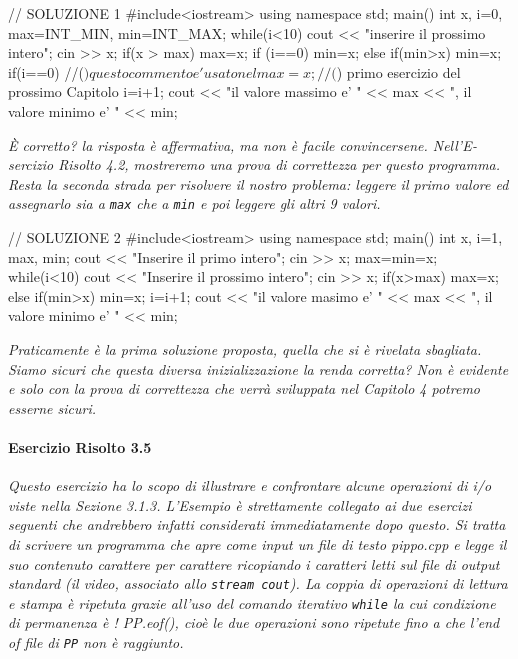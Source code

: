 \documentclass[a4paper,12pt]{book}
\begin{document}
\begin{codice}

// SOLUZIONE 1
#include<iostream>
using namespace std;
main() {
  int x, i=0, max=INT_MIN, min=INT_MAX;
  while(i<10) {
    cout << "inserire il prossimo intero";
    cin >> x; 
    if(x > max) {
      max=x;
      if (i==0)
        min=x;
    }
    else
      if(min>x) {
        min=x;
        if(i==0) //($) questo commento e' usato nel
        max=x;   //($) primo esercizio del prossimo Capitolo
      }
    i=i+1;
  }
  cout << "il valore massimo e' " << max << ", il valore minimo e' " << min;
}
\end{codice}

\textit{È corretto? la risposta è affermativa, ma non è facile convincersene.
Nell'E­sercizio Risolto 4.2, mostreremo una prova di correttezza per questo programma.
Resta la seconda strada per risolvere il nostro problema: leggere il primo valore ed assegnarlo sia a \texttt{max} che a \texttt{min} e poi leggere gli altri 9 valori.}

\begin{codice}

// SOLUZIONE 2
#include<iostream>
using namespace std;
main() {
  int x, i=1, max, min;
  cout << "Inserire il primo intero";
  cin >> x;
  max=min=x;
  while(i<10) {
    cout << "Inserire il prossimo intero";
    cin >> x;
    if(x>max)
      max=x;
    else
      if(min>x)
        min=x;
    i=i+1;
  }
  cout << "il valore masimo e' " << max << ", il valore minimo e' " << min;
}
\end{codice}

\noindent \textit{Praticamente è la prima soluzione proposta, quella che si è rivelata sbagliata.
Siamo sicuri che questa diversa inizializzazione la renda corretta?
Non è evidente e solo con la prova di correttezza che verrà sviluppata nel Capitolo 4 potremo esserne sicuri.}

\paragraph{Esercizio Risolto 3.5}
\textit{Questo esercizio ha lo scopo di illustrare e confrontare alcune operazioni di i/o viste nella Sezione 3.1.3.
L'Esempio è strettamente collegato ai due esercizi seguenti che andrebbero infatti considerati immediatamente dopo questo.
Si tratta di scrivere un programma che apre come input un file di testo pip­po.cpp e legge il suo contenuto carattere per carattere ricopiando i caratteri letti sul file di output standard (il video, associato allo \texttt{stream cout}).
La coppia di operazioni di lettura e stampa è ripetuta grazie all'uso del comando iterativo \texttt{while} la cui condizione di permanenza è ! PP.eof(), cioè le due operazioni sono ripetute fino a che l'end of file di \texttt{PP} non è raggiunto.}
\end{document}
